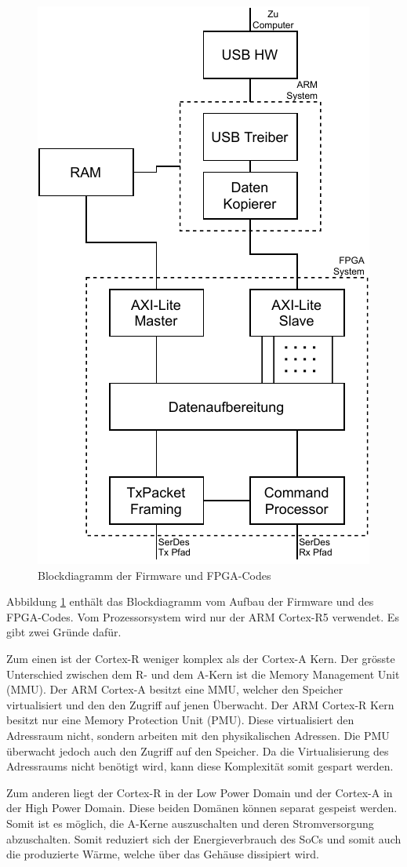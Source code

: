 \documentclass{article}
\begin{document}
\begin{figure}[tb]
    \includegraphics[width=0.6\linewidth]{drawio/bd_firmware}
    \caption{Blockdiagramm der Firmware und FPGA-Codes}
    \label{fig:bd_firmware}
\end{figure}

Abbildung \ref{fig:bd_firmware} enthält das Blockdiagramm vom Aufbau der Firmware und des FPGA-Codes. Vom Prozessorsystem wird nur der ARM Cortex-R5 verwendet. Es gibt zwei Gründe dafür. 

Zum einen ist der Cortex-R weniger komplex als der Cortex-A Kern. Der grösste Unterschied zwischen dem R- und dem A-Kern ist die Memory Management Unit (MMU). Der ARM Cortex-A besitzt eine MMU, welcher den Speicher virtualisiert und den den Zugriff auf jenen Überwacht. Der ARM Cortex-R Kern besitzt nur eine Memory Protection Unit (PMU). Diese virtualisiert den Adressraum nicht, sondern arbeiten mit den physikalischen Adressen. Die PMU überwacht jedoch auch den Zugriff auf den Speicher. Da die Virtualisierung des Adressraums nicht benötigt wird, kann diese Komplexität somit gespart werden. 

Zum anderen liegt der Cortex-R in der Low Power Domain und der Cortex-A in der High Power Domain. Diese beiden Domänen können separat gespeist werden. Somit ist es möglich, die A-Kerne auszuschalten und deren Stromversorgung abzuschalten. Somit reduziert sich der Energieverbrauch des SoCs und somit auch die produzierte Wärme, welche über das Gehäuse dis­si­pie­rt wird.
\end{document}
